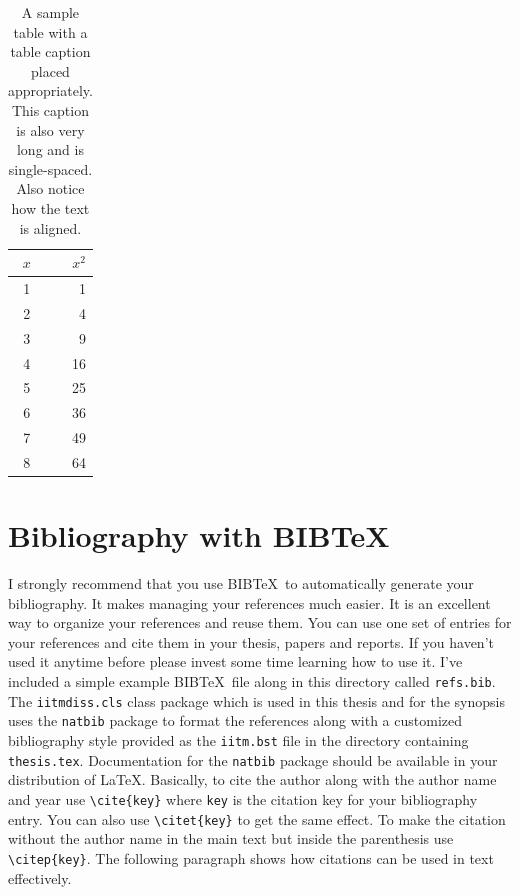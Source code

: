  \begin{table}[htbp]
   \caption{A sample table with a table caption placed
     appropriately. This caption is also very long and is
     single-spaced.  Also notice how the text is aligned.}
   \begin{center}
   \begin{tabular}[c]{|c|r|} \hline
     $x$ & $x^2$ \\ \hline 
     1  &  1   \\
     2  &  4  \\
     3  &  9  \\
     4  &  16  \\
     5  &  25  \\
     6  &  36  \\
     7  &  49  \\
     8  &  64  \\ \hline
   \end{tabular}
   \label{tab:sample}
   \end{center}
 \end{table}
 
 \section{Bibliography with BIB\TeX}
 
 I strongly recommend that you use BIB\TeX\ to automatically generate
 your bibliography.  It makes managing your references much easier.  It
 is an excellent way to organize your references and reuse them.  You
 can use one set of entries for your references and cite them in your
 thesis, papers and reports.  If you haven't used it anytime before
 please invest some time learning how to use it.  
 I've included a simple example BIB\TeX\ file along in this directory
called \verb+refs.bib+.  The \verb+iitmdiss.cls+ class package which
 is used in this thesis and for the synopsis uses the \verb+natbib+
 package to format the references along with a customized bibliography
 style provided as the \verb+iitm.bst+ file in the directory containing
 \verb+thesis.tex+.  Documentation for the \verb+natbib+ package should
 be available in your distribution of \LaTeX.  Basically, to cite the
 author along with the author name and year use \verb+\cite{key}+ where
 \verb+key+ is the citation key for your bibliography entry.  You can
 also use \verb+\citet{key}+ to get the same effect.  To make the
 citation without the author name in the main text but inside the
 parenthesis use \verb+\citep{key}+.  The following paragraph shows how
 citations can be used in text effectively.
 
